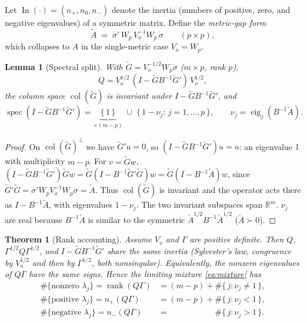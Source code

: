 \documentclass[11pt]{article}
\newcommand{\rank}{\operatorname{rank}}
\newcommand{\In}{\operatorname{In}}
\newcommand{\np}{n_{+}}
\newcommand{\nz}{n_{0}}
\newcommand{\nm}{n_{-}}
\theoremstyle{plain}
\newtheorem{theorem}{Theorem}
\newtheorem{lemma}{Lemma}
\theoremstyle{remark}
\begin{document}
Let $\In(\cdot)=(\np,\nz,\nm)$ denote the inertia (numbers of positive, zero,
and negative eigenvalues) of a symmetric matrix. Define the \emph{metric-gap
form}
\begin{equation}\label{eq:Atil}
  \tilde A \;=\; \dot\sigma'\,W_{\!p}\,V_{\!o}^{-1}W_{\!p}\,\dot\sigma
  \qquad(p\times p),
\end{equation}
which collapses to $A$ in the single-metric case $V_{\!o}=W_{\!p}$.

\begin{lemma}[Spectral split]\label{lem:split}
With $\tilde G=V_{\!o}^{-1/2}W_{\!p}\dot\sigma$ ($m\times p$, rank $p$),
\[
  Q=V_{\!o}^{1/2}\,(I-\tilde G B^{-1}\tilde G')\,V_{\!o}^{1/2},
\]
the column space $\operatorname{col}(\tilde G)$ is invariant under
$I-\tilde G B^{-1}\tilde G'$, and
\begin{equation}\label{eq:spectrum}
  \operatorname{spec}(I-\tilde G B^{-1}\tilde G')
  =\underbrace{\{\,1\,\}}_{\times(m-p)}\;\cup\;\{\,1-\nu_j:\,j=1,\dots,p\,\},
  \qquad \nu_j=\operatorname{eig}_j(B^{-1}\tilde A).
\end{equation}
\end{lemma}

\begin{proof}
On $\operatorname{col}(\tilde G)^{\perp}$ we have $\tilde G'u=0$, so
$(I-\tilde G B^{-1}\tilde G')u=u$: an eigenvalue $1$ with multiplicity $m-p$. For
$v=\tilde G w$, $(I-\tilde G B^{-1}\tilde G')\tilde G w
=\tilde G(I-B^{-1}\tilde G'\tilde G)w=\tilde G(I-B^{-1}\tilde A)w$, since
$\tilde G'\tilde G=\dot\sigma'W_{\!p}V_{\!o}^{-1}W_{\!p}\dot\sigma=\tilde A$. Thus
$\operatorname{col}(\tilde G)$ is invariant and the operator acts there as
$I-B^{-1}\tilde A$, with eigenvalues $1-\nu_j$. The two invariant subspaces span
$\mathbb R^m$. $\nu_j$ are real because $B^{-1}\tilde A$ is similar to the
symmetric $\tilde A^{1/2}B^{-1}\tilde A^{1/2}$ ($\tilde A\succ0$).
\end{proof}

\begin{theorem}[Rank accounting]\label{thm:rank}
Assume $V_{\!o}$ and $\Gamma$ are positive definite. Then $Q$,
$\Gamma^{1/2}Q\Gamma^{1/2}$, and $I-\tilde G B^{-1}\tilde G'$ share the same
inertia (Sylvester's law, congruence by $V_{\!o}^{1/2}$ and then by
$\Gamma^{1/2}$, both nonsingular). Equivalently, the nonzero eigenvalues of
$Q\Gamma$ have the same signs. Hence the limiting mixture \eqref{eq:mixture}
has
\begin{align}
  \#\{\text{nonzero }\lambda_j\}=\rank(Q\Gamma)
    &=(m-p)+\#\{\,j:\nu_j\neq1\,\},\label{eq:rk}\\
  \#\{\text{positive }\lambda_j\}=\np(Q\Gamma)
    &=(m-p)+\#\{\,j:\nu_j<1\,\},\label{eq:pos}\\
  \#\{\text{negative }\lambda_j\}=\nm(Q\Gamma)
    &=\phantom{(m-p)+{}}\#\{\,j:\nu_j>1\,\}.\label{eq:neg}
\end{align}
\end{theorem}
\end{document}
